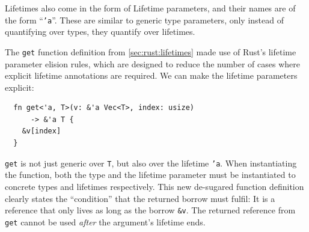 \documentclass[sigplan,11pt,screen,nonacm]{acmart}
\begin{document}
Lifetimes also come in the form of Lifetime parameters, and their names are of the form \enquote{\texttt{'a}}. These are similar to generic type parameters, only instead of quantifying over types, they quantify over lifetimes.

%

The \texttt{get} function definition from \cref{sec:rust:lifetimes} made use of Rust's lifetime parameter elision rules, which are designed to reduce the number of cases where explicit lifetime annotations are required. We can make the lifetime parameters explicit:
\begin{verbatim}
  fn get<'a, T>(v: &'a Vec<T>, index: usize)
      -> &'a T {
    &v[index]
  }
\end{verbatim}
\texttt{get} is not just generic over \texttt{T}, but also over the lifetime \texttt{'a}. When instantiating the function, both the type and the lifetime parameter must be instantiated to concrete types and lifetimes respectively. This new de-sugared function definition clearly states the \enquote{condition} that the returned borrow must fulfil: It is a reference that only lives as long as the borrow \texttt{&v}. The returned reference from \texttt{get} cannot be used \emph{after} the argument's lifetime ends.
\end{document}
